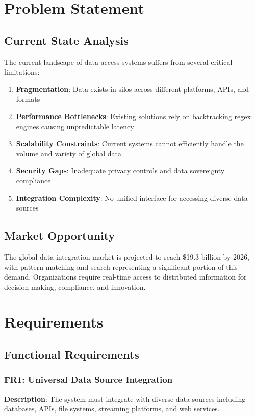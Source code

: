 \documentclass[11pt,a4paper]{article}
\begin{document}
\section{Problem Statement}

\subsection{Current State Analysis}
The current landscape of data access systems suffers from several critical limitations:

\begin{enumerate}
\item \textbf{Fragmentation}: Data exists in silos across different platforms, APIs, and formats
\item \textbf{Performance Bottlenecks}: Existing solutions rely on backtracking regex engines causing unpredictable latency
\item \textbf{Scalability Constraints}: Current systems cannot efficiently handle the volume and variety of global data
\item \textbf{Security Gaps}: Inadequate privacy controls and data sovereignty compliance
\item \textbf{Integration Complexity}: No unified interface for accessing diverse data sources
\end{enumerate}

\subsection{Market Opportunity}
The global data integration market is projected to reach \$19.3 billion by 2026, with pattern matching and search representing a significant portion of this demand. Organizations require real-time access to distributed information for decision-making, compliance, and innovation.

\section{Requirements}

\subsection{Functional Requirements}

\subsubsection{FR1: Universal Data Source Integration}
\textbf{Description}: The system must integrate with diverse data sources including databases, APIs, file systems, streaming platforms, and web services.
\end{document}
